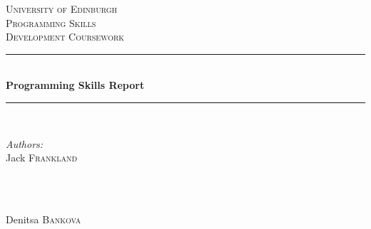 \begin{titlepage}

\newcommand{\HRule}{\rule{\linewidth}{0.5mm}} %

\center %
 

\textsc{\LARGE University of Edinburgh}\\[1.5cm] %
\textsc{\Large Programming Skills}\\[0.5cm] %
\textsc{\large Development Coursework}\\[0.5cm] %


\HRule \\[0.4cm]
{ \huge \bfseries Programming Skills Report}\\[0.4cm] %
\HRule \\[1.5cm]
 

\begin{minipage}{0.4\textwidth}
\begin{flushleft} \large
\emph{Authors:}\\
Jack \textsc{Frankland} %
\end{flushleft}
\end{minipage}
~
\begin{minipage}{0.4\textwidth}
\begin{flushright} \large
\emph{} \\
Denitsa \textsc{Bankova} %
\end{flushright}
\end{minipage}\\[2cm]



\end{titlepage}
